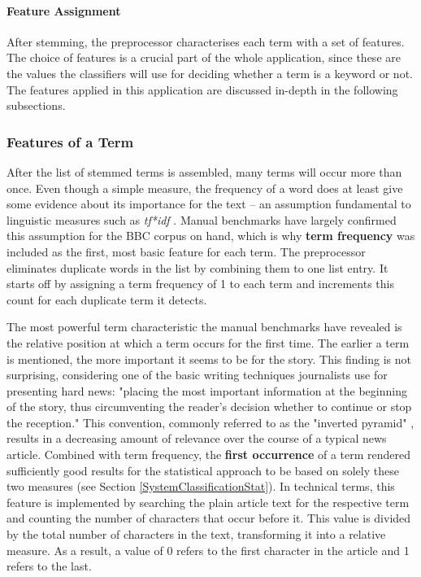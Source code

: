 \documentclass[11pt,a4paper,twoside]{article}
\begin{document}
\paragraph{Feature Assignment} After stemming, the preprocessor characterises each term with a set of features. The choice of features is a crucial part of the whole application, since these are the values the classifiers will use for deciding whether a term is a keyword or not. The features applied in this application are discussed in-depth in the following subsections.

\subsubsection{Features of a Term} \label{SystemPreprocessFeatures}

After the list of stemmed terms is assembled, many terms will occur more than once. Even though a simple measure, the frequency of a word does at least give some evidence about its importance for the text -- an assumption fundamental to linguistic measures such as \emph{tf*idf} \cite{Salton1988Term-weightingRetrieval}. Manual benchmarks have largely confirmed this assumption for the BBC corpus on hand, which is why \textbf{term frequency} was included as the first, most basic feature for each term. The preprocessor eliminates duplicate words in the list by combining them to one list entry. It starts off by assigning a term frequency of 1 to each term and increments this count for each duplicate term it detects.

The most powerful term characteristic the manual benchmarks have revealed is the relative position at which a term occurs for the first time. The earlier a term is mentioned, the more important it seems to be for the story. This finding is not surprising, considering one of the basic writing techniques journalists use for presenting hard news: "placing the most important information at the beginning of the story, thus circumventing the reader's decision whether to continue or stop the reception." \cite[p. 501]{Pottker2003NewsAppear} This convention, commonly referred to as the "inverted pyramid" \cite[ibd.]{Pottker2003NewsAppear}, results in a decreasing amount of relevance over the course of a typical news article. Combined with term frequency, the \textbf{first occurrence} of a term rendered sufficiently good results for the statistical approach to be based on solely these two measures (see Section \ref{SystemClassificationStat}). In technical terms, this feature is implemented by searching the plain article text for the respective term and counting the number of characters that occur before it. This value is divided by the total number of characters in the text, transforming it into a relative measure. As a result, a value of 0 refers to the first character in the article and 1 refers to the last.
\end{document}
